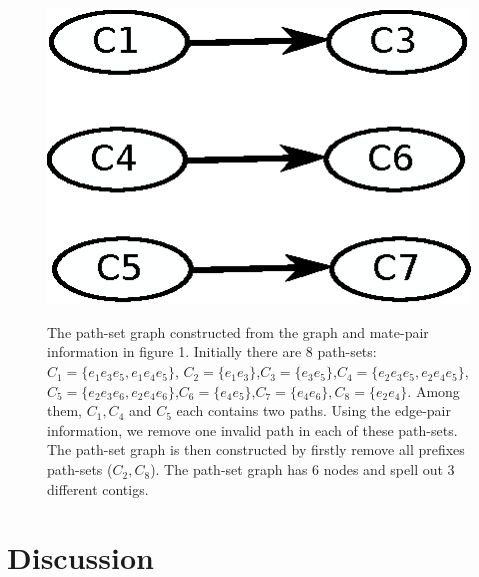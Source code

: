 \documentclass[12pt,a4paper,oneside]{article}
\begin{document}
\begin{figure}
    \begin{center}
    \includegraphics[scale =1] {fig/pathset7.eps}
    \label{fig:pathgraph1}
    \caption{The path-set graph constructed from the graph and mate-pair information in figure 1. Initially there are 8 path-sets: 
    $C_1= \{ e_1e_3e_5, e_1e_4e_5\}$,  $C_2= \{ e_1e_3\}$,$C_3= \{e_3e_5 \}$,$C_4= \{e_2e_3e_5,e_2e_4e_5 \}$,$C_5= \{e_2e_3e_6,e_2e_4e_6\}$,$C_6= \{e_4e_5 \}$,$C_7= \{e_4e_6 \}, C_8= \{e_2e_4 \}$.
Among them, $C_1, C_4$ and $C_5$ each contains two paths. Using the edge-pair information, we remove one invalid path in each of these path-sets. The path-set graph is then constructed
by firstly remove all prefixes path-sets ($C_2, C_8$). The path-set graph has 6 nodes and spell out 3 different contigs.  
}
    \end{center}
\end{figure}








\section{Discussion}
\end{document}

